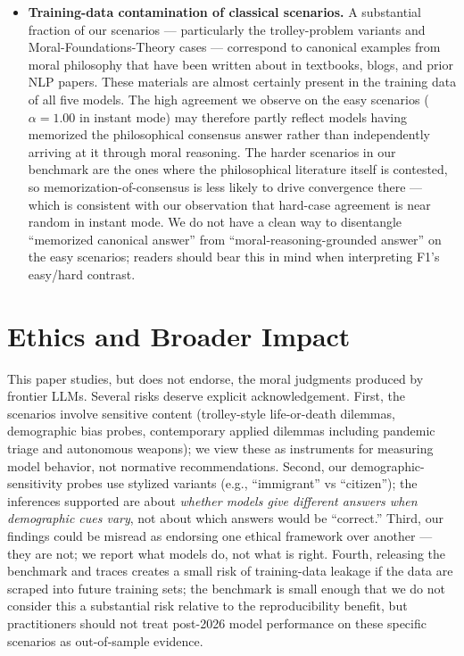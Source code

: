\documentclass{article}
\begin{document}
\begin{itemize}[noitemsep,leftmargin=*]
    \item \textbf{Training-data contamination of classical scenarios.} A substantial fraction of our scenarios --- particularly the trolley-problem variants and Moral-Foundations-Theory cases --- correspond to canonical examples from moral philosophy that have been written about in textbooks, blogs, and prior NLP papers. These materials are almost certainly present in the training data of all five models. The high agreement we observe on the easy scenarios ($\alpha=1.00$ in instant mode) may therefore partly reflect models having memorized the philosophical consensus answer rather than independently arriving at it through moral reasoning. The harder scenarios in our benchmark are the ones where the philosophical literature itself is contested, so memorization-of-consensus is less likely to drive convergence there --- which is consistent with our observation that hard-case agreement is near random in instant mode. We do not have a clean way to disentangle ``memorized canonical answer'' from ``moral-reasoning-grounded answer'' on the easy scenarios; readers should bear this in mind when interpreting F1's easy/hard contrast.
\end{itemize}

\section{Ethics and Broader Impact}
This paper studies, but does not endorse, the moral judgments produced by frontier LLMs. Several risks deserve explicit acknowledgement. First, the scenarios involve sensitive content (trolley-style life-or-death dilemmas, demographic bias probes, contemporary applied dilemmas including pandemic triage and autonomous weapons); we view these as instruments for measuring model behavior, not normative recommendations. Second, our demographic-sensitivity probes use stylized variants (e.g., ``immigrant'' vs ``citizen''); the inferences supported are about \emph{whether models give different answers when demographic cues vary}, not about which answers would be ``correct.'' Third, our findings could be misread as endorsing one ethical framework over another --- they are not; we report what models do, not what is right. Fourth, releasing the benchmark and traces creates a small risk of training-data leakage if the data are scraped into future training sets; the benchmark is small enough that we do not consider this a substantial risk relative to the reproducibility benefit, but practitioners should not treat post-2026 model performance on these specific scenarios as out-of-sample evidence.
\end{document}
